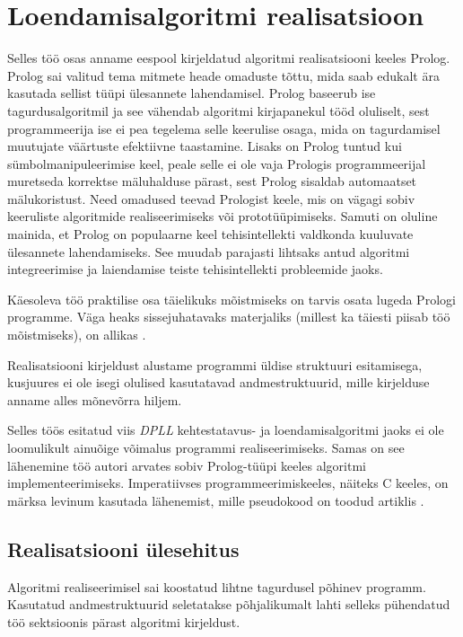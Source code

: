 \chapter{Loendamisalgoritmi realisatsioon}

Selles töö osas anname eespool kirjeldatud algoritmi realisatsiooni
keeles Prolog. Prolog sai valitud tema mitmete heade omaduste
tõttu, mida saab edukalt ära kasutada sellist tüüpi ülesannete lahendamisel.
Prolog baseerub ise tagurdusalgoritmil ja see vähendab algoritmi
kirjapanekul tööd oluliselt, sest programmeerija ise ei pea
tegelema selle keerulise osaga, mida on tagurdamisel muutujate
väärtuste efektiivne taastamine. Lisaks on Prolog tuntud kui
sümbolmanipuleerimise keel, peale selle ei ole vaja Prologis
programmeerijal muretseda korrektse mäluhalduse pärast, sest Prolog
sisaldab automaatset mälukoristust. Need omadused teevad Prologist keele,
mis on vägagi sobiv keeruliste algoritmide
realiseerimiseks või prototüüpimiseks. Samuti on oluline mainida, et
Prolog on populaarne keel tehisintellekti valdkonda kuuluvate ülesannete
lahendamiseks. See muudab parajasti lihtsaks antud algoritmi integreerimise ja
laiendamise teiste tehisintellekti probleemide jaoks.

Käesoleva töö praktilise osa täielikuks mõistmiseks on tarvis osata lugeda
Prologi programme. Väga heaks sissejuhatavaks materjaliks (millest ka täiesti
piisab töö mõistmiseks), on allikas \cite{tamme03}.

Realisatsiooni kirjeldust alustame programmi üldise struktuuri esitamisega,
kusjuures ei ole isegi olulised kasutatavad andmestruktuurid, mille
kirjelduse anname alles mõnevõrra hiljem.

Selles töös esitatud viis \textit{DPLL} kehtestatavus- ja loendamisalgoritmi
jaoks ei ole loomulikult ainuõige võimalus programmi realiseerimiseks. Samas on
see lähenemine töö autori arvates sobiv Prolog-tüüpi keeles algoritmi
implementeerimiseks. Imperatiivses programmeerimiskeeles, näiteks C
keeles, on märksa levinum kasutada lähenemist, mille pseudokood on toodud
artiklis \cite{silva96}.

\newpage

\section{Realisatsiooni ülesehitus}

Algoritmi realiseerimisel sai koostatud lihtne tagurdusel põhinev
programm. Kasutatud andmestruktuurid seletatakse põhjalikumalt lahti selleks
pühendatud töö sektsioonis pärast algoritmi kirjeldust.

